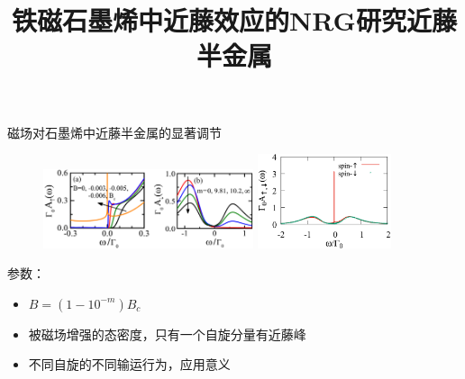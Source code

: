 \documentclass[9pt,t]{beamer} %
\begin{document}
\title{铁磁石墨烯中近藤效应的NRG研究\qquad \qquad \qquad \qquad 近藤半金属}
\begin{frame}{磁场对石墨烯中近藤半金属的显著调节}
\begin{figure}
\includegraphics[width=0.55\textwidth ,height=0.25\textwidth]{dos-B.png}
\includegraphics[width=0.35\textwidth,height=0.25\textwidth]{halfmetal.png}
\end{figure}
参数：
\begin{itemize}
\vspace{0.3cm}
\setlength\itemsep{0.5em}
\item $B=(1-10^{-m})B_{c}$
\item 被磁场增强的态密度，只有一个自旋分量有近藤峰
\item 不同自旋的不同输运行为，应用意义
\end{itemize}
\end{frame}
\end{document}
